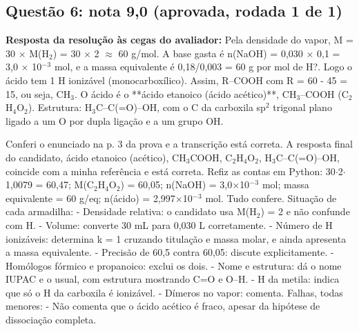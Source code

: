 \documentclass{article}%
\begin{document}
\subsection*{Questão 6: nota 9,0 (aprovada, rodada 1 de 1)}%
\textbf{Resposta da resolução às cegas do avaliador:} Pela densidade do vapor, M = 30 $\times$ M(H$_{2}$) = 30 $\times$ 2 $\approx$ 60 g/mol. A base gasta é n(NaOH) = 0,030 $\times$ 0,1 = 3,0 $\times$ 10$^{-}$$^3$ mol, e a massa equivalente é 0,18/0,003 = 60 g por mol de H?. Logo o ácido tem 1 H ionizável (monocarboxílico). Assim, R--COOH com R = 60 - 45 = 15, ou seja, CH$_{3}$. O ácido é o **ácido etanoico (ácido acético)**, CH$_{3}$--COOH (C$_{2}$H$_{4}$O$_{2}$). Estrutura: H$_{3}$C--C(=O)--OH, com o C da carboxila sp$^2$ trigonal plano ligado a um O por dupla ligação e a um grupo OH.\par %
Conferi o enunciado na p. 3 da prova e a transcrição está correta. A resposta final do candidato, ácido etanoico (acético), CH$_{3}$COOH, C$_{2}$H$_{4}$O$_{2}$, H$_{3}$C--C(=O)--OH, coincide com a minha referência e está correta. Refiz as contas em Python: 30$\cdot$2$\cdot$1,0079 = 60,47; M(C$_{2}$H$_{4}$O$_{2}$) = 60,05; n(NaOH) = 3,0$\times$10$^{-}$$^3$ mol; massa equivalente = 60 g/eq; n(ácido) = 2,997$\times$10$^{-}$$^3$ mol. Tudo confere.\newline%
\newline%
Situação de cada armadilha:\newline%
{-} Densidade relativa: o candidato usa M(H$_{2}$) = 2 e não confunde com H.\newline%
{-} Volume: converte 30 mL para 0,030 L corretamente.\newline%
{-} Número de H ionizáveis: determina k = 1 cruzando titulação e massa molar, e ainda apresenta a massa equivalente.\newline%
{-} Precisão de 60,5 contra 60,05: discute explicitamente.\newline%
{-} Homólogos fórmico e propanoico: exclui os dois.\newline%
{-} Nome e estrutura: dá o nome IUPAC e o usual, com estrutura mostrando C=O e O--H.\newline%
{-} H da metila: indica que só o H da carboxila é ionizável.\newline%
{-} Dímeros no vapor: comenta.\newline%
\newline%
Falhas, todas menores:\newline%
{-} Não comenta que o ácido acético é fraco, apesar da hipótese de dissociação completa.\newline%
$$
\end{document}
